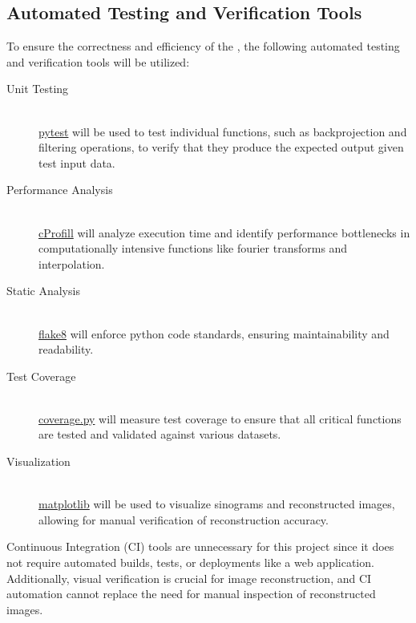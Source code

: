 \documentclass[12pt, titlepage]{article}
\begin{document}


\subsection{Automated Testing and Verification Tools} \label{3.6} To ensure the
correctness and efficiency of the \progname, the following automated
testing and verification tools will be utilized:
\begin{description}
\item[Unit Testing] \hfill \\
  \href{https://docs.pytest.org/en/stable/}{pytest} will be used to test
  individual functions, such as backprojection and filtering operations, to
  verify that they produce the expected output given test input data.
\item[Performance Analysis] \hfill \\
  \href{https://docs.python.org/3/library/profile.html#module-cprofile}{cProfill}
  will analyze execution time and identify performance bottlenecks in
  computationally intensive functions like fourier transforms and interpolation.
\item[Static Analysis] \hfill \\
  \href{https://flake8.pycqa.org/en/latest/}{flake8} will enforce python code
  standards, ensuring maintainability and readability.
\item[Test Coverage] \hfill \\
  \href{https://coverage.readthedocs.io/en/7.6.12/}{coverage.py} will measure
  test coverage to ensure that all critical functions are tested and validated
  against various datasets.
\item[Visualization] \hfill \\
  \href{https://matplotlib.org/}{matplotlib} will be used to visualize sinograms
  and reconstructed images, allowing for manual verification of reconstruction
  accuracy.
\end{description}
Continuous Integration (CI) tools are unnecessary for this project since it does
not require automated builds, tests, or deployments like a web application.
Additionally, visual verification is crucial for image reconstruction, and CI
automation cannot replace the need for manual inspection of reconstructed
images.
\end{document}

